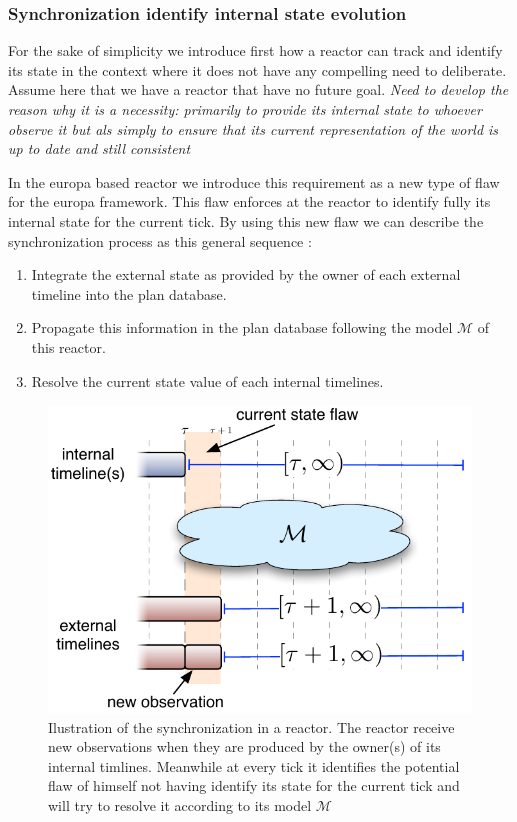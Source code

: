 \subsubsection{Synchronization identify internal state evolution}
\label{sec:arch:synch}

For the sake of simplicity we introduce first how a reactor can track
and identify its state in the context where it does not have any
compelling need to deliberate. Assume here that we have a reactor that
have no future goal. {\em Need to develop the reason why it is a
  necessity: primarily to provide its internal state to whoever
  observe it but als simply to ensure that its current representation
  of the world is up to date and still consistent}

In the europa based reactor we introduce this requirement as a new
type of flaw for the europa framework. This flaw enforces at the
reactor to identify fully its internal state for the current
tick. By using this new flaw we can describe the synchronization
process as this general sequence :
\begin{enumerate}
\item Integrate the external state as provided by the owner of each
  external timeline into the plan database.
\item Propagate this information in the plan database following the
  model $\mathcal{M}$ of this reactor.
\item Resolve the current state value of each internal timelines.
\end{enumerate}

\begin{figure}[!htbp]
  \centering
  \includegraphics[width=0.5\columnwidth]{figs/synch-relation}
  \caption{Ilustration of the synchronization in a reactor. The
    reactor receive new observations when they are produced by the
    owner(s) of its internal timlines. Meanwhile at every tick it
    identifies the potential flaw of himself not having identify its
    state for the current tick and will try to resolve it according to
    its model $\mathcal{M}$} 
  \label{fig:synch:flaw}
\end{figure}

